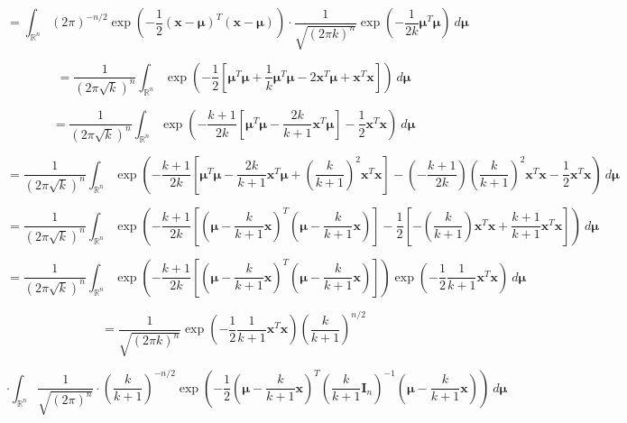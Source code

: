 \begin{solution}
\begin{enumerate}[(a)]
\[
= \int_{\mathbb{R}^n}  (2 \pi)^{-n/2} \exp \left(- \frac{1}{2}(\boldsymbol{x} - \boldsymbol{\mu}) ^T  (\boldsymbol{x} - \boldsymbol{\mu} ) \right)  \cdot \frac{1}{\sqrt{(2 \pi k)^n}} \exp \left(- \frac{1}{2k}\boldsymbol{\mu} ^T  \boldsymbol{\mu} \right) \ d \boldsymbol{\mu}
\]

\[
= \frac{1}{(2 \pi \sqrt{k})^n  } \int_{\mathbb{R}^n}  \exp \left(- \frac{1}{2}\left[  \boldsymbol{\mu} ^T\boldsymbol{\mu}  + \frac{1}{k}\boldsymbol{\mu} ^T  \boldsymbol{\mu}  - 2 \boldsymbol{x} ^T\boldsymbol{\mu}   + \boldsymbol{x}^T \boldsymbol{x}  \right]  \right)  \ d \boldsymbol{\mu}
\]

\[
= \frac{1}{(2 \pi \sqrt{k})^n  } \int_{\mathbb{R}^n}  \exp \left(-  \frac{k+1}{2k} \left[  \boldsymbol{\mu} ^T\boldsymbol{\mu}   -  \frac{2k}{k+1} \boldsymbol{x} ^T\boldsymbol{\mu}   \right] - \frac{1}{2}  \boldsymbol{x}^T \boldsymbol{x}   \right)  \ d \boldsymbol{\mu}
\]

\[
= \frac{1}{(2 \pi \sqrt{k})^n  } \int_{\mathbb{R}^n}  \exp \left(-  \frac{k+1}{2k} \left[  \boldsymbol{\mu} ^T\boldsymbol{\mu}   -  \frac{2k}{k+1} \boldsymbol{x} ^T\boldsymbol{\mu} + \left(\frac{k}{k+1} \right)^2 \boldsymbol{x}^T \boldsymbol{x}    \right] - \left(-  \frac{k+1}{2k} \right) \left(\frac{k}{k+1} \right)^2 \boldsymbol{x}^T \boldsymbol{x} - \frac{1}{2}  \boldsymbol{x}^T \boldsymbol{x}   \right)  \ d \boldsymbol{\mu}
\]

\[
= \frac{1}{(2 \pi \sqrt{k})^n  } \int_{\mathbb{R}^n}  \exp \left(-  \frac{k+1}{2k} \left[  \left( \boldsymbol{\mu} -  \frac{k}{k+1}  \boldsymbol{x} \right) ^T\left( \boldsymbol{\mu} -  \frac{k}{k+1} \boldsymbol{x} \right) \right] - \frac{1}{2} \left[ -\left(\frac{k}{k+1} \right) \boldsymbol{x}^T \boldsymbol{x}  + \frac{k+1}{k+1}  \boldsymbol{x}^T \boldsymbol{x}   \right] \right)  \ d \boldsymbol{\mu}
\]

\[
= \frac{1}{(2 \pi \sqrt{k})^n  } \int_{\mathbb{R}^n}  \exp \left(-  \frac{k+1}{2k} \left[  \left( \boldsymbol{\mu} -  \frac{k}{k+1}  \boldsymbol{x} \right) ^T\left( \boldsymbol{\mu} -  \frac{k}{k+1} \boldsymbol{x} \right) \right] \right) \exp \left(- \frac{1}{2} \frac{1}{k+1}  \boldsymbol{x}^T \boldsymbol{x}   \right)  \ d \boldsymbol{\mu}
\]

\[
= \frac{1}{\sqrt{(2 \pi k )^n}} \exp \left(- \frac{1}{2} \frac{1}{k+1} \boldsymbol{x}^T \boldsymbol{x}   \right)\left( \frac{k}{k+1} \right)^{n/2}
\]

\[
\cdot \int_{\mathbb{R}^n}  \frac{1}{\sqrt{(2 \pi)^n}}  \cdot \left( \frac{k}{k+1} \right)^{-n/2}   \exp \left(-  \frac{1}{2}   \left( \boldsymbol{\mu} -  \frac{k}{k+1}  \boldsymbol{x} \right) ^T \left( \frac{k}{k+1}\boldsymbol{I}_n \right)^{-1} \left( \boldsymbol{\mu} -  \frac{k}{k+1} \boldsymbol{x} \right)  \right)   \ d \boldsymbol{\mu}
\]


\end{enumerate}
\end{solution}
